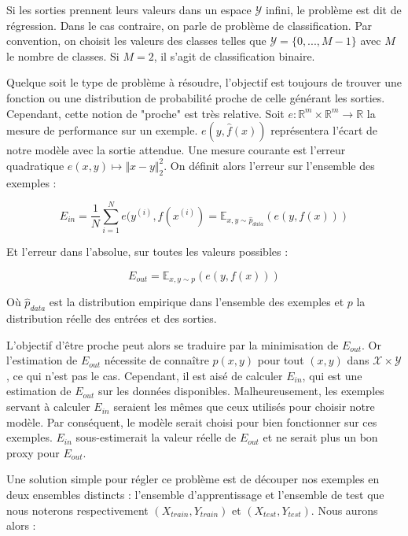 \documentclass{report}
\begin{document}
Si les sorties prennent leurs valeurs dans un espace $\mathcal{Y}$ infini, le problème est dit de régression. Dans le cas contraire, on parle de problème de classification. Par convention, on choisit les valeurs des classes telles que $\mathcal{Y} = \{0, ..., M-1\}$ avec $M$ le nombre de classes. Si $M = 2$, il s'agit de classification binaire.

Quelque soit le type de problème à résoudre, l'objectif est toujours de trouver une fonction ou une distribution de probabilité proche de celle générant les sorties. Cependant, cette notion de "proche" est très relative. Soit $e : \mathbb{R}^m \times \mathbb{R}^m \rightarrow \mathbb{R}$ la mesure de performance sur un exemple. $e(y, \hat{f}(x))$ représentera l'écart de notre modèle avec la sortie attendue. Une mesure courante est l'erreur quadratique $e(x, y) \mapsto \Vert x - y \Vert_2^2$. On définit alors l'erreur sur l'ensemble des exemples :

\begin{equation}
E_{in} = \frac{1}{N}\sum_{i=1}^{N}{e(y^{(i)}, f(x^{(i)})} = \mathbb{E}_{x, y \sim \hat{p}_{data}}(e(y, f(x)))
\end{equation}

Et l'erreur dans l'absolue, sur toutes les valeurs possibles :

\begin{equation}
E_{out} = \mathbb{E}_{x, y \sim p}(e(y, f(x)))
\end{equation}

Où $\hat{p}_{data}$ est la distribution empirique dans l'ensemble des exemples et $p$ la distribution réelle des entrées et des sorties.

L'objectif d'être proche peut alors se traduire par la minimisation de $E_{out}$. Or l'estimation de $E_{out}$ nécessite de connaître $p(x, y)$ pour tout $(x, y)$ dans $\mathcal{X} \times \mathcal{Y}$, ce qui n'est pas le cas. Cependant, il est aisé de calculer $E_{in}$, qui est une estimation de $E_{out}$ sur les données disponibles. Malheureusement, les exemples servant à calculer $E_{in}$ seraient les mêmes que ceux utilisés pour choisir notre modèle. Par conséquent, le modèle serait choisi pour bien fonctionner sur ces exemples. $E_{in}$ sous-estimerait la valeur réelle de $E_{out}$ et ne serait plus un bon proxy pour $E_{out}$.

Une solution simple pour régler ce problème est de découper nos exemples en deux ensembles distincts : l'ensemble d'apprentissage et l'ensemble de test que nous noterons respectivement $(X_{train}, Y_{train})$ et $(X_{test}, Y_{test})$. Nous aurons alors :
\end{document}
